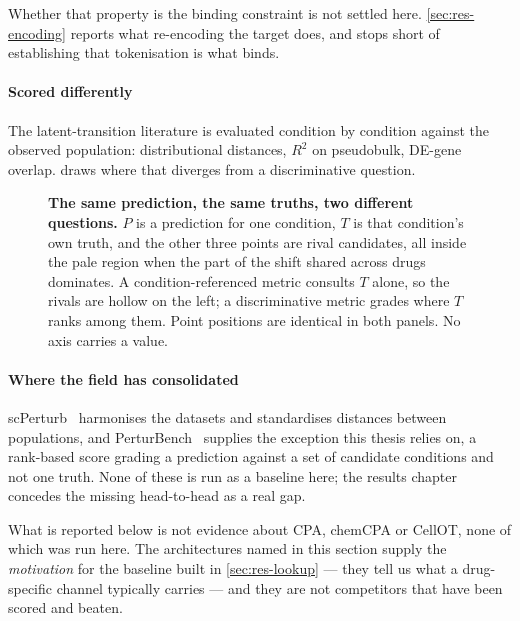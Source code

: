 Whether that property is the binding constraint is not settled here.
\cref{sec:res-encoding} reports what re-encoding the target does, and stops
short of establishing that tokenisation is what binds.

\paragraph{Scored differently} The latent-transition literature is evaluated
condition by condition against the observed population: distributional distances,
$R^2$ on pseudobulk, DE-gene overlap.  draws where that
diverges from a discriminative question.

\begin{figure}[htbp]
\centering

\caption[Two questions about one prediction]{\textbf{The same prediction, the
same truths, two different questions.} $P$ is a prediction for one condition, $T$
is that condition's own truth, and the other three points are rival candidates,
all inside the pale region when the part of the shift shared across drugs
dominates. A
condition-referenced metric consults $T$ alone, so the rivals are hollow on the
left; a discriminative metric grades where $T$ ranks among them. Point positions
are identical in both panels. No axis carries a value.}
\label{fig:two-questions}
\end{figure}

\paragraph{Where the field has consolidated}
scPerturb~\cite{scperturb} harmonises the datasets and standardises distances
between populations, and PerturBench~\cite{perturbench} supplies the
exception this thesis relies on, a rank-based score grading a prediction against
a set of candidate conditions and not one truth. None of these is run as a
baseline here; the results chapter concedes the missing head-to-head as a real
gap.

\begin{scopelimit}
What is reported below is not evidence about CPA, chemCPA or CellOT, none of
which was run here. The architectures named in this section supply the
\emph{motivation} for the baseline built in \cref{sec:res-lookup} --- they tell
us what a drug-specific channel typically carries --- and they are not
competitors that have been scored and beaten.
\end{scopelimit}

